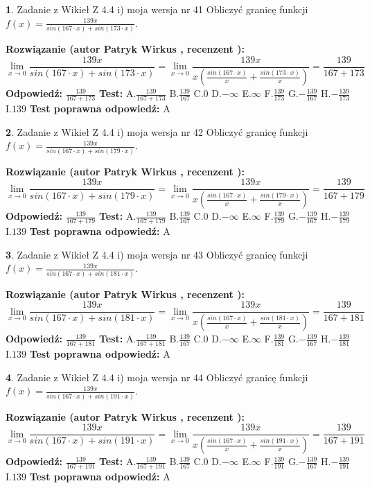 \documentclass[12pt, a4paper]{article}
\theoremstyle{definition} %
\newtheorem{zad}{}
\newcommand{\zadStart}[1]{\begin{zad}#1\newline}
\newcommand{\zadStop}{\end{zad}}
\newcommand{\rozwStart}[2]{\noindent \textbf{Rozwiązanie (autor #1 , recenzent #2): }\newline}
\newcommand{\rozwStop}{\newline}
\newcommand{\odpStart}{\noindent \textbf{Odpowiedź:}\newline}
\newcommand{\odpStop}{\newline}
\newcommand{\testStart}{\noindent \textbf{Test:}\newline}
\newcommand{\testStop}{\newline}
\newcommand{\kluczStart}{\noindent \textbf{Test poprawna odpowiedź:}\newline}
\newcommand{\kluczStop}{\newline}
\begin{document}
\zadStart{Zadanie z Wikieł Z 4.4 i) moja wersja nr 41}
Obliczyć granicę funkcji $f(x)=\frac{139x}{sin(167\cdot x) +sin(173\cdot x)}$.
\zadStop
\rozwStart{Patryk Wirkus}{}
$$\lim\limits_{x\to 0}\frac{139x}{sin(167\cdot x) +sin(173\cdot x)}=\lim\limits_{x\to 0}\frac{139x}{x(\frac{sin(167\cdot x)}{x}+\frac{sin(173\cdot x)}{x})}=\frac{139}{167+173}$$
\rozwStop
\odpStart
$\frac{139}{167+173}$
\odpStop
\testStart
A.$\frac{139}{167+173}$
B.$\frac{139}{167}$
C.$0$
D.$-\infty$
E.$\infty$
F.$\frac{139}{173}$
G.$-\frac{139}{167}$
H.$-\frac{139}{173}$
I.$139$
\testStop
\kluczStart
A
\kluczStop



\zadStart{Zadanie z Wikieł Z 4.4 i) moja wersja nr 42}
Obliczyć granicę funkcji $f(x)=\frac{139x}{sin(167\cdot x) +sin(179\cdot x)}$.
\zadStop
\rozwStart{Patryk Wirkus}{}
$$\lim\limits_{x\to 0}\frac{139x}{sin(167\cdot x) +sin(179\cdot x)}=\lim\limits_{x\to 0}\frac{139x}{x(\frac{sin(167\cdot x)}{x}+\frac{sin(179\cdot x)}{x})}=\frac{139}{167+179}$$
\rozwStop
\odpStart
$\frac{139}{167+179}$
\odpStop
\testStart
A.$\frac{139}{167+179}$
B.$\frac{139}{167}$
C.$0$
D.$-\infty$
E.$\infty$
F.$\frac{139}{179}$
G.$-\frac{139}{167}$
H.$-\frac{139}{179}$
I.$139$
\testStop
\kluczStart
A
\kluczStop



\zadStart{Zadanie z Wikieł Z 4.4 i) moja wersja nr 43}
Obliczyć granicę funkcji $f(x)=\frac{139x}{sin(167\cdot x) +sin(181\cdot x)}$.
\zadStop
\rozwStart{Patryk Wirkus}{}
$$\lim\limits_{x\to 0}\frac{139x}{sin(167\cdot x) +sin(181\cdot x)}=\lim\limits_{x\to 0}\frac{139x}{x(\frac{sin(167\cdot x)}{x}+\frac{sin(181\cdot x)}{x})}=\frac{139}{167+181}$$
\rozwStop
\odpStart
$\frac{139}{167+181}$
\odpStop
\testStart
A.$\frac{139}{167+181}$
B.$\frac{139}{167}$
C.$0$
D.$-\infty$
E.$\infty$
F.$\frac{139}{181}$
G.$-\frac{139}{167}$
H.$-\frac{139}{181}$
I.$139$
\testStop
\kluczStart
A
\kluczStop



\zadStart{Zadanie z Wikieł Z 4.4 i) moja wersja nr 44}
Obliczyć granicę funkcji $f(x)=\frac{139x}{sin(167\cdot x) +sin(191\cdot x)}$.
\zadStop
\rozwStart{Patryk Wirkus}{}
$$\lim\limits_{x\to 0}\frac{139x}{sin(167\cdot x) +sin(191\cdot x)}=\lim\limits_{x\to 0}\frac{139x}{x(\frac{sin(167\cdot x)}{x}+\frac{sin(191\cdot x)}{x})}=\frac{139}{167+191}$$
\rozwStop
\odpStart
$\frac{139}{167+191}$
\odpStop
\testStart
A.$\frac{139}{167+191}$
B.$\frac{139}{167}$
C.$0$
D.$-\infty$
E.$\infty$
F.$\frac{139}{191}$
G.$-\frac{139}{167}$
H.$-\frac{139}{191}$
I.$139$
\testStop
\kluczStart
A
\kluczStop
\end{document}
